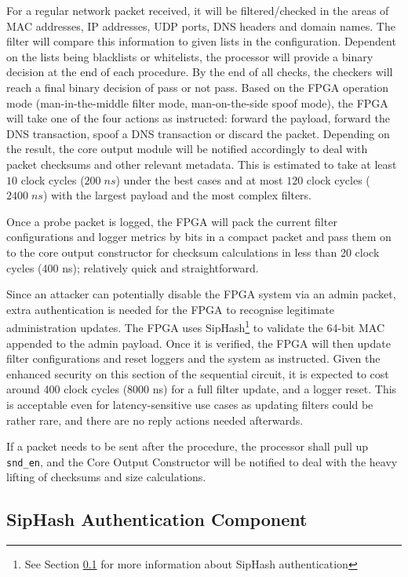 \documentclass[a4paper]{report}
\newcommand{\code}{\texttt}
\begin{document}
For a regular network packet received, it will be filtered/checked in the areas of MAC addresses, IP addresses, UDP ports, DNS headers and domain names. The filter will compare this information to given lists in the configuration. Dependent on the lists being blacklists or whitelists, the processor will provide a binary decision at the end of each procedure. By the end of all checks, the checkers will reach a final binary decision of pass or not pass. Based on the FPGA operation mode (man-in-the-middle filter mode, man-on-the-side spoof mode), the FPGA will take one of the four actions as instructed: forward the payload, forward the DNS transaction, spoof a DNS transaction or discard the packet. Depending on the result, the core output module will be notified accordingly to deal with packet checksums and other relevant metadata. This is estimated to take at least $10$ clock cycles ($200\; ns$) under the best cases and at most $120$ clock cycles ($2400\; ns$) with the largest payload and the most complex filters.  

Once a probe packet is logged, the FPGA will pack the current filter configurations and logger metrics by bits in a compact packet and pass them on to the core output constructor for checksum calculations in less than 20 clock cycles (400 ns); relatively quick and straightforward.

Since an attacker can potentially disable the FPGA system via an admin packet, extra authentication is needed for the FPGA to recognise legitimate administration updates. The FPGA uses SipHash\footnote{See Section \ref{section:implementation-hardware-implementation-siphash} for more information about SipHash authentication} to validate the 64-bit MAC appended to the admin payload. Once it is verified, the FPGA will then update filter configurations and reset loggers and the system as instructed. Given the enhanced security on this section of the sequential circuit, it is expected to cost around 400 clock cycles (8000 ns) for a full filter update, and a logger reset. This is acceptable even for latency-sensitive use cases as updating filters could be rather rare, and there are no reply actions needed afterwards.

If a packet needs to be sent after the procedure, the processor shall pull up \code{snd\_en}, and the Core Output Constructor will be notified to deal with the heavy lifting of checksums and size calculations.

\subsection{SipHash Authentication Component}
\label{section:implementation-hardware-implementation-siphash}
\end{document}
